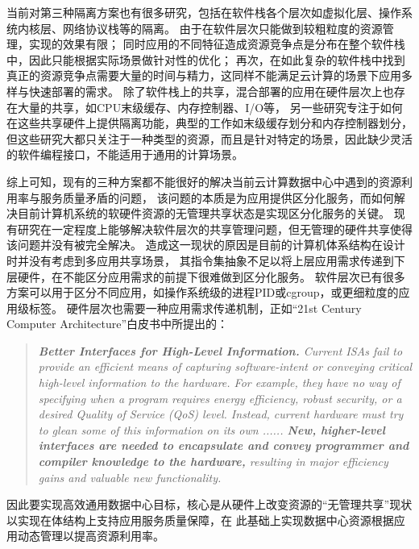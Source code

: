 当前对第三种隔离方案也有很多研究，包括在软件栈各个层次如虚拟化层\cite{}、操作系统内核层\cite{}、网络协议栈\cite{}等的隔离。
由于在软件层次只能做到较粗粒度的资源管理，实现的效果有限；
同时应用的不同特征造成资源竞争点是分布在整个软件栈中，因此只能根据实际场景做针对性的优化；
再次，在如此复杂的软件栈中找到真正的资源竞争点需要大量的时间与精力，这同样不能满足云计算的场景下应用多样与快速部署的需求。
除了软件栈上的共享，混合部署的应用在硬件层次上也存在大量的共享，如CPU末级缓存、内存控制器、I/O等，
另一些研究专注于如何在这些共享硬件上提供隔离功能，典型的工作如末级缓存划分\cite{}和内存控制器划分\cite{}，
但这些研究大都只关注于一种类型的资源，而且是针对特定的场景，因此缺少灵活的软件编程接口，不能适用于通用的计算场景。

综上可知，现有的三种方案都不能很好的解决当前云计算数据中心中遇到的资源利用率与服务质量矛盾的问题，
该问题的本质是为应用提供区分化服务，而如何解决目前计算机系统的软硬件资源的无管理共享状态是实现区分化服务的关键。
现有研究在一定程度上能够解决软件层次的共享管理问题，但无管理的硬件共享使得该问题并没有被完全解决。
造成这一现状的原因是目前的计算机体系结构在设计时并没有考虑到多应用共享场景，
其指令集抽象不足以将上层应用需求传递到下层硬件，在不能区分应用需求的前提下很难做到区分化服务。
软件层次已有很多方案可以用于区分不同应用，如操作系统级的进程PID或cgroup，或更细粒度的应用级标签。%
硬件层次也需要一种应用需求传递机制，正如“21st Century Computer Architecture”白皮书中所提出的：

\begin{quotation} 
\emph{\textbf{Better Interfaces for High-Level Information.}
Current ISAs fail to provide an efficient means of capturing software-intent or conveying critical high-level information to the hardware.
For example, they have no way of specifying when a program requires energy efficiency, robust security, or a desired Quality of Service (QoS) level.
Instead, current hardware must try to glean some of this information on its own ......
\textbf{New, higher-level interfaces are needed to encapsulate and convey programmer and compiler knowledge to the hardware,}
resulting in major efficiency gains and valuable new functionality.}\cite{21st_architecture}
\end{quotation}

因此要实现高效通用数据中心目标，核心是从硬件上改变资源的“无管理共享”现状以实现在体结构上支持应用服务质量保障，在
此基础上实现数据中心资源根据应用动态管理以提高资源利用率。

